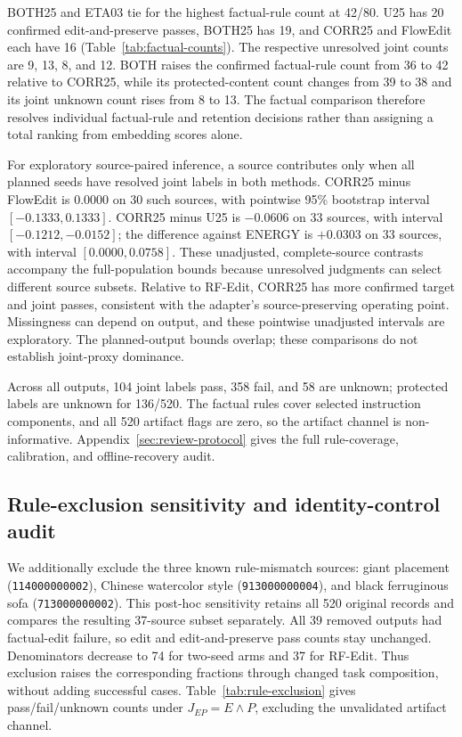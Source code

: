 BOTH25 and ETA03 tie for the highest factual-rule count at 42/80. U25 has 20 confirmed edit-and-preserve passes, BOTH25 has 19, and CORR25 and FlowEdit each have 16 (Table~\ref{tab:factual-counts}). The respective unresolved joint counts are 9, 13, 8, and 12. BOTH raises the confirmed factual-rule count from 36 to 42 relative to CORR25, while its protected-content count changes from 39 to 38 and its joint unknown count rises from 8 to 13. The factual comparison therefore resolves individual factual-rule and retention decisions rather than assigning a total ranking from embedding scores alone.

For exploratory source-paired inference, a source contributes only when all planned seeds have resolved joint labels in both methods. CORR25 minus FlowEdit is $0.0000$ on 30 such sources, with pointwise 95\% bootstrap interval $[-0.1333,0.1333]$. CORR25 minus U25 is $-0.0606$ on 33 sources, with interval $[-0.1212,-0.0152]$; the difference against ENERGY is $+0.0303$ on 33 sources, with interval $[0.0000,0.0758]$. These unadjusted, complete-source contrasts accompany the full-population bounds because unresolved judgments can select different source subsets. Relative to RF-Edit, CORR25 has more confirmed target and joint passes, consistent with the adapter's source-preserving operating point. Missingness can depend on output, and these pointwise unadjusted intervals are exploratory. The planned-output bounds overlap; these comparisons do not establish joint-proxy dominance.

Across all outputs, 104 joint labels pass, 358 fail, and 58 are unknown; protected labels are unknown for 136/520. The factual rules cover selected instruction components, and all 520 artifact flags are zero, so the artifact channel is non-informative. Appendix~\ref{sec:review-protocol} gives the full rule-coverage, calibration, and offline-recovery audit.

\subsection{Rule-exclusion sensitivity and identity-control audit}
We additionally exclude the three known rule-mismatch sources: giant placement (\texttt{114000000002}), Chinese watercolor style (\texttt{913000000004}), and black ferruginous sofa (\texttt{713000000002}). This post-hoc sensitivity retains all 520 original records and compares the resulting 37-source subset separately. All 39 removed outputs had factual-edit failure, so edit and edit-and-preserve pass counts stay unchanged. Denominators decrease to 74 for two-seed arms and 37 for RF-Edit. Thus exclusion raises the corresponding fractions through changed task composition, without adding successful cases. Table~\ref{tab:rule-exclusion} gives pass/fail/unknown counts under $J_{EP}=E\wedge P$, excluding the unvalidated artifact channel.


